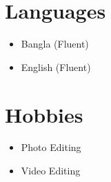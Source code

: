 \documentclass[11pt,a4paper]{article}
\begin{document}
\section{Languages}
\begin{itemize}
    \item Bangla (Fluent)
    \item English (Fluent)
\end{itemize}

\section{Hobbies}
\begin{itemize}
    \item Photo Editing
    \item Video Editing
\end{itemize}

\end{document}
